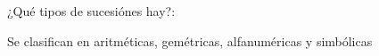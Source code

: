 
\question ¿Qué tipos de sucesiónes hay?:
  \begin{solution}[2cm]
    Se clasifican en aritméticas, gemétricas, alfanuméricas y simbólicas
  \end{solution}
